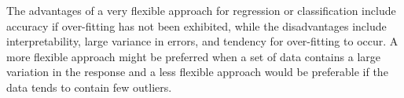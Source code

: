 The advantages of a very flexible approach for regression or classification
include accuracy if over-fitting has not been exhibited, while the disadvantages
include interpretability, large variance in errors, and tendency for
over-fitting to
occur. A more flexible approach might be preferred when a set of data contains
a large variation in the response and a less flexible approach would be
preferable if the data tends to contain few outliers.\par
